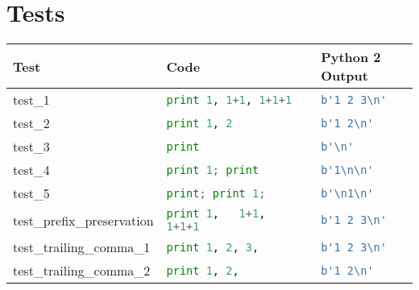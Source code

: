 \section{Tests}
\begin{table*}[htb]
    \centering
    \begin{tabular}{@{}l|ll@{}}
    \toprule
    Test                                  & Code                                                  & Python 2 Output                        \\ \midrule
    test\_1                               & \lstinline[language=Python, style=pythonstyle]|print 1, 1+1, 1+1+1                                  | & \lstinline[language=Python, style=pythonstyle]|b'1 2 3\n'             | \\
    test\_2                               & \lstinline[language=Python, style=pythonstyle]|print 1, 2                                           | & \lstinline[language=Python, style=pythonstyle]|b'1 2\n'               | \\
    test\_3                               & \lstinline[language=Python, style=pythonstyle]|print                                                | & \lstinline[language=Python, style=pythonstyle]|b'\n'                  | \\
    test\_4                               & \lstinline[language=Python, style=pythonstyle]|print 1; print                                       | & \lstinline[language=Python, style=pythonstyle]|b'1\n\n'| \\
    test\_5                               & \lstinline[language=Python, style=pythonstyle]|print; print 1;                                      | & \lstinline[language=Python, style=pythonstyle]|b'\n1\n'| \\
    test\_prefix\_preservation            & \lstinline[language=Python, style=pythonstyle]|print 1,   1+1,   1+1+1                              | & \lstinline[language=Python, style=pythonstyle]|b'1 2 3\n'             | \\
    test\_trailing\_comma\_1              & \lstinline[language=Python, style=pythonstyle]|print 1, 2, 3,                                       | & \lstinline[language=Python, style=pythonstyle]|b'1 2 3\n'             | \\
    test\_trailing\_comma\_2              & \lstinline[language=Python, style=pythonstyle]|print 1, 2,                                          | & \lstinline[language=Python, style=pythonstyle]|b'1 2\n'               | \\

\end{tabular}
\end{table*}
